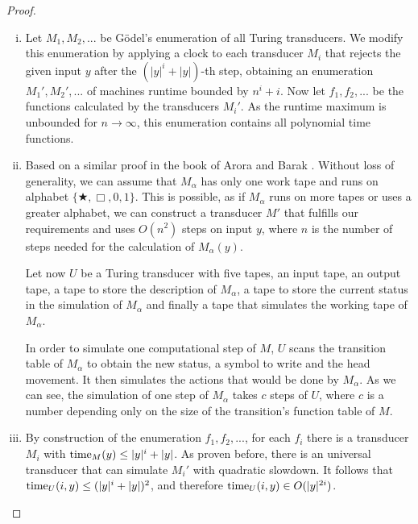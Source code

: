   \begin{proof}
    \begin{enumerate}[(i)]
     \item Let \(M_1, M_2, ...\) be Gödel's enumeration of all Turing transducers. We modify this enumeration by applying a clock to each transducer \(M_i\) that rejects the given input \(y\) after the \((|y|^i + |y|)\)-th step, obtaining an enumeration \(M_1', M_2', ...\) of machines runtime bounded by \(n^i+i\). Now let \(f_1,f_2,...\) be the functions calculated by the transducers \(M_i'\). As the runtime maximum is unbounded for \(n \to \infty\), this enumeration contains all polynomial time functions.
     
     \item Based on a similar proof in the book of Arora and Barak \cite{AB09}. Without loss of generality, we can assume that \(M_\alpha\) has only one work tape and runs on alphabet \( \{ \bigstar, \Box, 0, 1 \}\). This is possible, as if \(M_\alpha\) runs on more tapes or uses a greater alphabet, we can construct a transducer \(M'\) that fulfills our requirements and uses \(O(n^2)\) steps on input \(y\), where \(n\) is the number of steps needed for the calculation of \(M_\alpha(y)\). 
     
     Let now \(U\) be a Turing transducer with five tapes, an input tape, an output tape, a tape to store the description of \(M_\alpha\), a tape to store the current status in the simulation of \(M_\alpha\) and finally a tape that simulates the working tape of \(M_\alpha\).
     
     In order to simulate one computational step of \(M\), \(U\) scans the transition table of \(M_\alpha\) to obtain the new status, a symbol to write and the head movement. It then simulates the actions that would be done by \(M_\alpha\). As we can see, the simulation of one step of \(M_\alpha\) takes \(c\) steps of \(U\), where \(c\) is a number depending only on the size of the transition's function table of \(M\).
     
     \item By construction of the enumeration \(f_1,f_2,...\), for each \(f_i\) there is a transducer \(M_i\) with \(\operatorname{time}_M(y) \leq |y|^i + |y|\). As proven before, there is an universal transducer that can simulate \(M_i'\) with quadratic slowdown. It follows that \(\operatorname{time}_U(i,y) \leq (|y|^i + |y|)^2\), and therefore \(\operatorname{time}_U(i,y) \in O(|y|^{2i})\).
    \end{enumerate}
  \end{proof}
  
